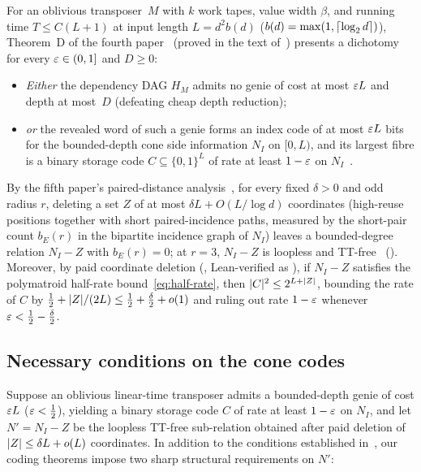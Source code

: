 For an oblivious transposer~$M$ with $k$ work tapes, value width $\beta$, and running time $T \le C(L + 1)$ at input
length $L = d^2 b(d)$ ($b(d) = \max(1, \lceil \log_2 d \rceil)$), Theorem~D of the fourth paper~\cite[Section~4.2, Theorem~4.10]{FourthPaper2026}
(proved in the text of~\cite{FourthPaper2026}) presents a dichotomy for every $\varepsilon \in (0, 1]$ and $D \ge 0$:
\begin{itemize}[leftmargin=2em]
\item \emph{Either} the dependency DAG $H_M$ admits no genie of cost at most $\varepsilon L$ and depth at most~$D$ (defeating
  cheap depth reduction);
\item \emph{or} the revealed word of such a genie forms an index code of at most $\varepsilon L$ bits for the bounded-depth cone
  side information $N_I$ on $[0, L)$, and its largest fibre is a binary storage code $C \subseteq \{0,1\}^L$ of rate at
  least $1 - \varepsilon$ on $N_I$~\cite[Remark~4.9(b)]{FourthPaper2026}.
\end{itemize}
By the fifth paper's paired-distance analysis~\cite[Theorem~3.3 and Corollaries~3.7 and~3.8]{DirectedRecovery2026}, for
every fixed $\delta > 0$ and odd radius $r$, deleting a set $Z$ of at most $\delta L + O(L / \log d)$ coordinates
(high-reuse positions together with short paired-incidence paths, measured by the short-pair count $b_E(r)$ in the
bipartite incidence graph of $N_I$) leaves a bounded-degree relation $N_I - Z$ with $b_E(r) = 0$; at $r = 3$, $N_I - Z$
is loopless and TT-free~\cite[Lemma~2.1]{SeventhPaper2026} (). Moreover, by
paid coordinate deletion (\cite[Corollary~6.9]{SeventhPaper2026}, Lean-verified as
), if $N_I - Z$ satisfies the polymatroid half-rate bound~\eqref{eq:half-rate},
then $\lvert C \rvert^2 \le 2^{L + \lvert Z \rvert}$, bounding the rate of $C$ by $\tfrac{1}{2} + \lvert Z \rvert/(2L) \le \tfrac{1}{2} +
\tfrac{\delta}{2} + o(1)$ and ruling out rate $1 - \varepsilon$ whenever $\varepsilon < \tfrac{1}{2} - \tfrac{\delta}{2}$.

\subsection{Necessary conditions on the cone codes}\label{sec:con-codes}

Suppose an oblivious linear-time transposer admits a bounded-depth genie of cost $\varepsilon L$ ($\varepsilon < \tfrac{1}{2}$),
yielding a binary storage code $C$ of rate at least $1 - \varepsilon$ on $N_I$, and let $N' = N_I - Z$ be the loopless TT-free
sub-relation obtained after paid deletion of $\lvert Z \rvert \le \delta L + o(L)$ coordinates. In addition to the conditions
established in~\cite{FourthPaper2026,DirectedRecovery2026,SeventhPaper2026,EighthPaper2026}, our coding theorems impose
two sharp structural requirements on $N'$:

